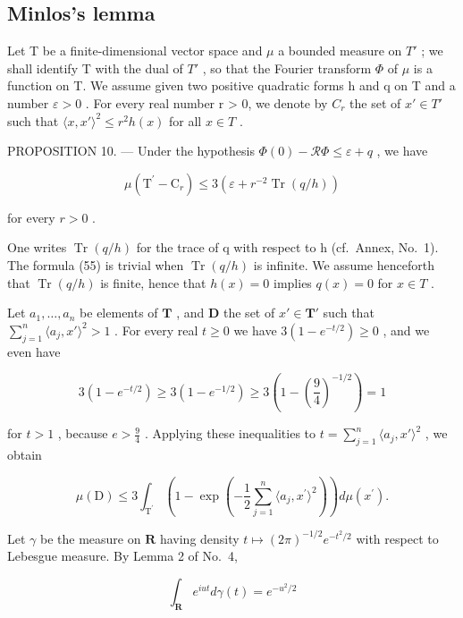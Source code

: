 \subsection{Minlos's lemma}

Let T be a finite-dimensional vector space and \(\mu\) a bounded measure on \(T'\) ; we shall identify T with the dual of \(T'\) , so that the Fourier transform \(\Phi\) of \(\mu\) is a function on T. We assume given two positive quadratic forms h and q on T and a number \(\varepsilon > 0\) . For every real number r > 0, we denote by \(C_{r}\) the set of \(x' \in T'\) such that \(\langle x, x' \rangle^{2} \leqslant r^{2} h(x)\) for all \(x \in T\) .

PROPOSITION 10. --- Under the hypothesis \(\Phi(0) - \mathcal{R}\Phi \leqslant \varepsilon + q\) , we have

\[
\mu (\mathrm{T} ^ {\prime} - \mathrm{C} _ {r}) \leqslant 3 \left(\varepsilon + r ^ {- 2} \operatorname{Tr} (q / h)\right)\tag{55}
\]

for every \(r > 0\) .

One writes \(\operatorname{Tr}(q/h)\) for the trace of q with respect to h (cf.~Annex, No.~1). The formula (55) is trivial when \(\operatorname{Tr}(q/h)\) is infinite. We assume henceforth that \(\operatorname{Tr}(q/h)\) is finite, hence that \(h(x)=0\) implies \(q(x)=0\) for \(x\in T\) .

Let \(a_1, \ldots, a_n\) be elements of \(\mathbf{T}\) , and \(\mathbf{D}\) the set of \(x' \in \mathbf{T}'\) such that \(\sum_{j=1}^{n} \langle a_j, x' \rangle^2 > 1\) . For every real \(t \geqslant 0\) we have \(3(1 - e^{-t/2}) \geqslant 0\) , and we even have

\[
3 (1 - e ^ {- t / 2}) \geqslant 3 (1 - e ^ {- 1 / 2}) \geqslant 3 \left(1 - \left(\frac {9}{4}\right) ^ {- 1 / 2}\right) = 1
\]

for \(t > 1\) , because \(e > \frac{9}{4}\) . Applying these inequalities to \(t = \sum_{j=1}^{n} \langle a_j, x' \rangle^2\) , we obtain

\[
\mu (\mathrm{D}) \leqslant 3 \int_ {\mathrm{T} ^ {\prime}} \left(1 - \exp \left(- \frac {1}{2} \sum_ {j = 1} ^ {n} \langle a _ {j}, x ^ {\prime} \rangle^ {2}\right)\right) d \mu (x ^ {\prime}).\tag{56}
\]

Let \(\gamma\) be the measure on \(\mathbf{R}\) having density \(t \mapsto (2\pi)^{-1/2} e^{-t^2/2}\) with respect to Lebesgue measure. By Lemma 2 of No.~4,

\[
\int_ {\mathbf {R}} e ^ {i u t} d \gamma (t) = e ^ {- u ^ {2} / 2}
\]

